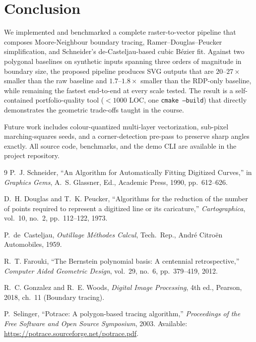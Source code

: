 \documentclass[twocolumn,a4paper,10pt]{article}
\begin{document}
\section{Conclusion}
\label{sec:conclusion}

We implemented and benchmarked a complete raster-to-vector pipeline
that composes Moore-Neighbour boundary tracing, Ramer--Douglas--Peucker
simplification, and Schneider's de-Casteljau-based cubic B\'ezier
fit.  Against two polygonal baselines on synthetic inputs spanning
three orders of magnitude in boundary size, the proposed pipeline
produces SVG outputs that are $20$--$27\times$ smaller than the raw
baseline and $1.7$--$1.8\times$ smaller than the RDP-only baseline,
while remaining the fastest end-to-end at every scale tested.  The
result is a self-contained portfolio-quality tool ($<\!1000$ LOC, one
\texttt{cmake --build}) that directly demonstrates the geometric
trade-offs taught in the course.

Future work includes colour-quantized multi-layer vectorization,
sub-pixel marching-squares seeds, and a corner-detection pre-pass to
preserve sharp angles exactly.  All source code, benchmarks, and the
demo CLI are available in the project repository.

\begin{thebibliography}{9}
P.~J. Schneider, ``An Algorithm for Automatically Fitting Digitized
Curves,'' in \emph{Graphics Gems}, A.~S. Glassner, Ed., Academic
Press, 1990, pp.~612--626.

D.~H. Douglas and T.~K. Peucker, ``Algorithms for the reduction of the
number of points required to represent a digitized line or its
caricature,'' \emph{Cartographica}, vol.~10, no.~2, pp.~112--122, 1973.

P.~de~Casteljau, \emph{Outillage M\'ethodes Calcul}, Tech.\ Rep.,
Andr\'e Citro\"en Automobiles, 1959.

R.~T. Farouki, ``The Bernstein polynomial basis: A centennial
retrospective,'' \emph{Computer Aided Geometric Design}, vol.~29,
no.~6, pp.~379--419, 2012.

R.~C. Gonzalez and R.~E. Woods, \emph{Digital Image Processing}, 4th
ed., Pearson, 2018, ch.~11 (Boundary tracing).

P.~Selinger, ``Potrace: A polygon-based tracing algorithm,''
\emph{Proceedings of the Free Software and Open Source Symposium},
2003.  Available: \url{https://potrace.sourceforge.net/potrace.pdf}.
\end{thebibliography}
\end{document}
